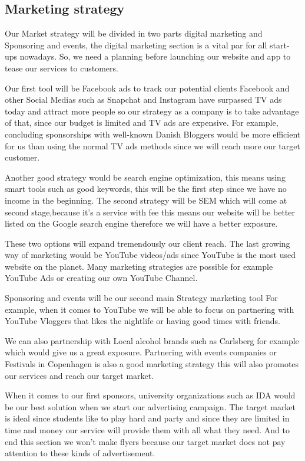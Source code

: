 \documentclass[12p]{article}
\begin{document}
\newpage


\subsection{Marketing strategy} \label{MarketingStrategy}
Our Market strategy will be divided in two parts digital marketing and Sponsoring and events, the digital marketing section is a vital par for all start-ups nowadays.
So, we need a planning before launching our website and app to tease our services to customers.

Our first tool will be Facebook ads to track our potential clients Facebook and other Social Medias such as Snapchat and Instagram have surpassed TV ads today and attract more people so our strategy as a company is to take advantage of that, since our budget is limited and TV ads are expensive. 
For example, concluding sponsorships with well-known Danish Bloggers would be more efficient for us than using the normal TV ads methods since we will reach more our target customer.

Another good strategy would be search engine optimization, this means using smart tools such as good keywords, this will be the first step since we have no income in the beginning.
The second strategy will be SEM which will come at second stage,because it's a service with fee  this means our website will be better listed on the Google search engine therefore we will have a better exposure.

These two options will expand tremendously our client reach.
The last growing way of marketing would be YouTube videos/ads since YouTube is the most used website on the planet.
Many marketing strategies are possible for example YouTube Ads or creating our own YouTube Channel.

Sponsoring and events will be our second main Strategy marketing tool
For example, when it comes to YouTube we will be able to focus on partnering with YouTube Vloggers that likes the nightlife or having good times with friends.

We can also partnership with Local alcohol brands such as Carlsberg for example which would give us a great exposure.
Partnering with events companies or Festivals in Copenhagen is also a good marketing strategy this will also promotes our services and reach our target market.

When it comes to our first sponsors, university organizations such as IDA would be our best solution when we start our advertising campaign.
The target market is ideal since students like to play hard and party and since they are limited in time and money our service will provide them with all what they need. And to end this section we won’t make flyers because our target market does not pay attention to these kinds of advertisement.
\end{document}
